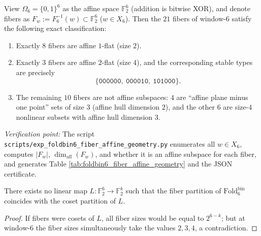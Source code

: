 \begin{enumerate}
  \begin{theorem}\label{thm:terminal-foldbin6-fiber-affine-geometry}
  View \(\Omega_6=\{0,1\}^6\) as the affine space \(\mathbb{F}_2^6\) (addition is bitwise XOR), and denote fibers as
  \(F_w:=F_6^{-1}(w)\subset \mathbb{F}_2^6\) (\(w\in X_6\)).
  Then the \(21\) fibers of window-\(6\) satisfy the following exact classification:
  \begin{enumerate}
    \item Exactly \(8\) fibers are affine \(1\)-flat (size \(2\)).
    \item Exactly \(3\) fibers are affine \(2\)-flat (size \(4\)), and the corresponding stable types are precisely
    \[
    \{\texttt{000000},\ \texttt{000010},\ \texttt{101000}\}.
    \]
    \item The remaining \(10\) fibers are not affine subspaces: \(4\) are ``affine plane minus one point'' sets of size \(3\) (affine hull dimension \(2\)), and the other \(6\) are size-\(4\) nonlinear subsets with affine hull dimension \(3\).
  \end{enumerate}
  \emph{Verification point:} The script \texttt{scripts/exp\_foldbin6\_fiber\_affine\_geometry.py} enumerates all \(w\in X_6\), computes \(|F_w|\), \(\dim_{\mathrm{aff}}(F_w)\), and whether it is an affine subspace for each fiber, and generates Table \ref{tab:foldbin6_fiber_affine_geometry} and the JSON certificate.
  \end{theorem}
  

  \begin{corollary}\label{cor:terminal-foldbin6-no-linear-kernel}
  There exists no linear map \(L:\mathbb{F}_2^6\to \mathbb{F}_2^k\) such that the fiber partition of \(\mathrm{Fold}^{\mathrm{bin}}_6\) coincides with the coset partition of \(L\).
  \begin{proof}
  If fibers were cosets of \(L\), all fiber sizes would be equal to \(2^{6-k}\); but at window-\(6\) the fiber sizes simultaneously take the values \(2,3,4\), a contradiction.
  \end{proof}
  \end{corollary}


\end{enumerate}

